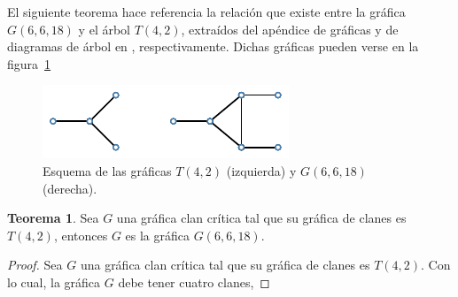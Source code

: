 \documentclass[12pt]{book}
\theoremstyle{definition}
\newtheorem{theorem}{Teorema}[chapter]
\begin{document}
El siguiente teorema hace referencia la relación que existe entre la gráfica $G(6,6,18)$ y el árbol $T(4,2)$, extraídos del apéndice de gráficas y de diagramas de árbol en \cite{Harary:1969}, respectivamente. Dichas gráficas pueden verse en la figura~\ref{F7}

\begin{figure}[!htbp]
	\centering
	\includegraphics[scale=1.2]{Fig7.pdf}
	\caption{Esquema de las gráficas $T(4,2)$ (izquierda) y $G(6,6,18)$ (derecha).\label{F7}}
\end{figure}

\begin{theorem}
Sea $G$ una gráfica clan crítica tal que su gráfica de clanes es $T(4,2)$, entonces $G$ es la gráfica $G(6,6,18)$.
\end{theorem}

\begin{proof}
Sea $G$ una gráfica clan crítica tal que su gráfica de clanes es $T(4,2)$. Con lo cual, la gráfica $G$ debe tener cuatro clanes, 
\end{proof}









\end{document}
